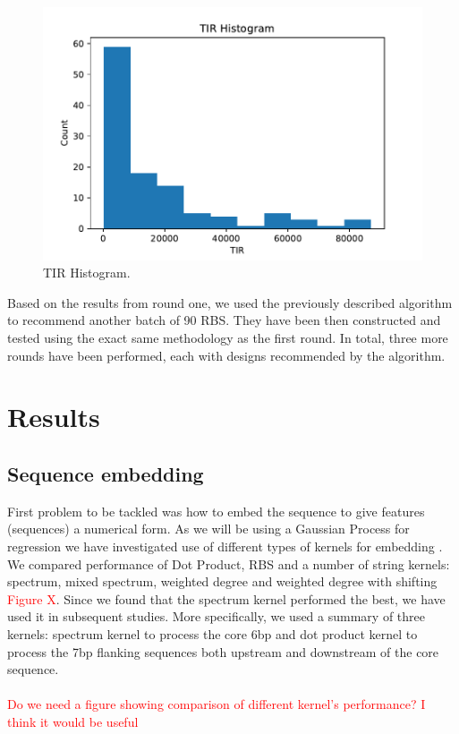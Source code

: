 \documentclass{article}
\begin{document}
\begin{figure}[t]
    \centering
    \includegraphics[scale=0.7]{plots/TIR_histogram.pdf}
    \caption{TIR Histogram.}
    \label{fig: TIR Histogram.}
\end{figure}

Based on the results from round one, we used the previously described algorithm to recommend another batch of 90 RBS. They have been then constructed and tested using the exact same methodology as the first round. In total, three more rounds have been performed, each with designs recommended by the algorithm. 

\section{Results}

\subsection{Sequence embedding}
First problem to be tackled was how to embed the sequence to give features (sequences) a numerical form. As we will be using a Gaussian Process for regression we have investigated use of different types of kernels for embedding \cite{Ben-Hur2008}. We compared performance of Dot Product, RBS and a number of string kernels: spectrum, mixed spectrum, weighted degree and weighted degree with shifting \textcolor{red}{Figure X}. Since we found that the spectrum kernel performed the best, we have used it in subsequent studies. More specifically, we used a summary of three kernels: spectrum kernel to process the core 6bp and dot product kernel to process the 7bp flanking sequences both upstream and downstream of the core sequence. 
\\
\\
\textcolor{red}{Do we need a figure showing comparison of different kernel's performance? I think it would be useful}
\end{document}
